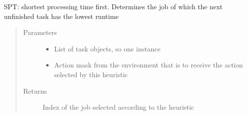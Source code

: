 \documentclass[letterpaper,10pt,english]{sphinxmanual}
\begin{document}
\begin{fulllineitems}
\label{\detokenize{agents.heuristic:agents.heuristic.heuristic_agent.spt}}
\sphinxAtStartPar
SPT: shortest processing time first. Determines the job of which the next unfinished task has the lowest runtime
\begin{quote}\begin{description}
\item[{Parameters}] \leavevmode\begin{itemize}
\item {} 
\sphinxAtStartPar
{} \textendash{} List of task objects, so one instance

\item {} 
\sphinxAtStartPar
{} \textendash{} Action mask from the environment that is to receive the action selected by this heuristic

\end{itemize}

\item[{Returns}] \leavevmode
\sphinxAtStartPar
Index of the job selected according to the heuristic

\end{description}\end{quote}

\end{fulllineitems}

\end{document}
